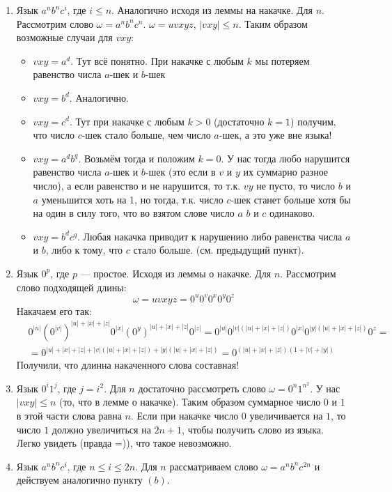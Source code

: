 \begin{solution}
\begin{enumerate}
	\item Язык $a^nb^nc^i$, где $i \leq n$. Аналогично исходя из леммы на накачке. Для $n$. Рассмотрим слово $\omega = a^nb^nc^n$. $\omega = uvxyz$, $|vxy| \leq n$. Таким образом возможные случаи для $vxy$:
	\begin{itemize}
		\item $vxy = a^d$. Тут всё понятно. При накачке с любым $k$ мы потеряем равенство числа $a$-шек и $b$-шек
		\item $vxy = b^d$. Аналогично.
		\item $vxy = c^d$. Тут при накачке с любым $k > 0$ (достаточно $k=1$) получим, что число $c$-шек стало больше, чем число $a$-шек, а это уже вне языка!
		\item $vxy = a^db^q$. Возьмём тогда и положим $k = 0$. У нас тогда любо нарушится равенство числа $a$-шек и $b$-шек (это если в $v$ и $y$ их суммарно разное число), а если равенство и не нарушится, то т.к. $vy$ не пусто, то число $b$ и $a$ уменьшится хоть на 1, но тогда, т.к. число $c$-шек станет больше хотя бы на один в силу того, что во взятом слове число $a$ $b$ и $c$ одинаково.
		\item $vxy = b^dc^q$. Любая накачка приводит к нарушению либо равенства числа $a$ и $b$, либо к тому, что $c$ стало больше. (см. предыдущий пункт).
	\end{itemize}
	\xqed
	\item Язык $0^p$, где $p$ --- простое. Исходя из леммы о накачке. Для $n$. Рассмотрим слово подходящей длины:
	\[
		\omega = uvxyz = 0^{u} 0^{v} 0^{x} 0^{y} 0^{z}
	\]
	Накачаем его так:
	\begin{align*}
		& 0^{|u|} (0^{|v|})^{|u|+|x|+|z|} 0^{|x|} (0^{y})^{|u|+|x|+|z|} 0^{|z|} = 
		0^{|u|} 0^{|v|(|u|+|x|+|z|)} 0^{|x|} 0^{|y|(|u|+|x|+|z|)} 0^{z} = \\
		& = 0^{|u|+|x|+|z| + |v|(|u|+|x|+|z|) + |y|(|u|+|x|+|z|)} = 0^{(|u|+|x|+|z|)(1 + |v| + |y|)}
	\end{align*}
	Получили, что длинна накаченного слова составная! \xqed

	\item Язык $0^i1^j$, где $j = i^2$. Для $n$ достаточно рассмотреть слово $\omega = 0^n 1^{n^2}$.
	У нас $|vxy| \leq n$ (то, что в лемме о накачке). Таким образом суммарное число $0$ и $1$ в этой части слова равна $n$. Если при накачке число $0$ увеличивается на $1$, то число $1$ должно увеличиться на $2n+1$, чтобы получить слово из языка. Легко увидеть (правда =)), что такое невозможно.
	\xqed

	\item Язык $a^nb^nc^i$, где $n \leq i \leq 2n$. Для $n$ рассматриваем слово $\omega = a^n b^n c^{2n}$ и действуем аналогично пункту $(b)$.
\end{enumerate}
\end{solution}


